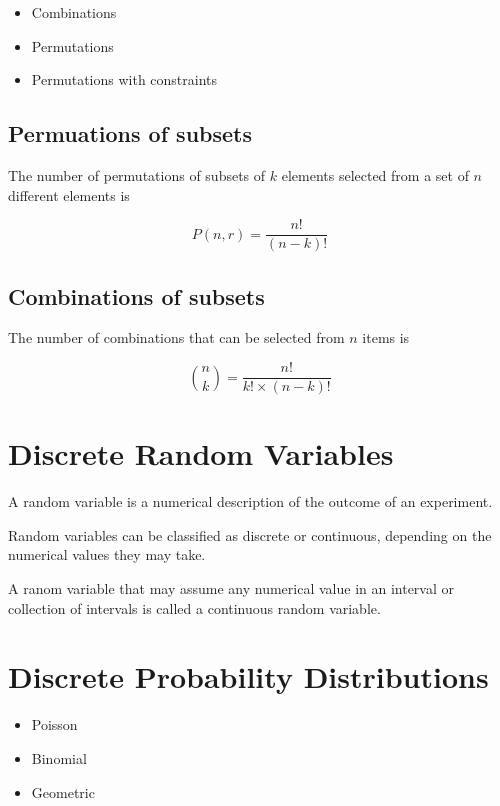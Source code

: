 \documentclass[12pt]{article}
\begin{document}
\begin{itemize}
\item Combinations
\item Permutations
\item Permutations with constraints
\end{itemize}



\subsection{Permuations of subsets}

The number of permutations of subsets of $k$ elements selected from a set of $n$ different elements is

\[P(n,r) = \frac{n!}{(n-k)!}  \]


\subsection{Combinations of subsets}

The number of combinations that can be selected from $n$ items is

\[ {n \choose k} = \frac{n!}{k! \times (n-k)!}  \]
\newpage
\section{Discrete Random Variables}

A random variable is a numerical description of the outcome of an experiment.

Random variables can be classified as discrete or continuous, depending on the numerical values they may take.

A ranom variable that may assume any numerical value in an interval or collection of intervals is called a continuous random variable.


\newpage
\section{Discrete Probability Distributions}

\begin{itemize}
\item Poisson
\item Binomial
\item Geometric
\end{itemize}
\end{document}
